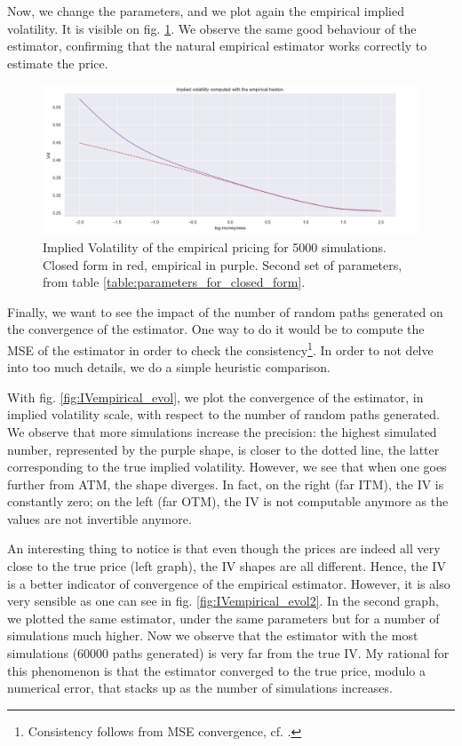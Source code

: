 Now, we change the parameters, and we plot again the empirical implied volatility. It is visible on fig. \ref{fig:IVempirical2}. We observe the same good behaviour of the estimator, confirming that the natural empirical estimator works correctly to estimate the price.

\begin{figure}
\centering
\includegraphics[width = 0.7 \textwidth]{../addition_part/images/integration_fft/IVempirical2.png}
\caption{Implied Volatility of the empirical pricing for 5000 simulations. Closed form in red, empirical in purple. Second set of parameters, from table \ref{table:parameters_for_closed_form}. }
\label{fig:IVempirical2}
\end{figure}

Finally, we want to see the impact of the number of random paths generated on the convergence of the estimator. One way to do it would be to compute the MSE of the estimator in order to check the consistency\footnote{Consistency follows from MSE convergence, cf. \cite{panaretos}.}. In order to not delve into too much details, we do a simple heuristic comparison.

With fig. \ref{fig:IVempirical_evol}, we plot the convergence of the estimator, in implied volatility scale, with respect to the number of random paths generated. We observe that more simulations increase the precision: the highest simulated number, represented by the purple shape, is closer to the dotted line, the latter corresponding to the true implied volatility. However, we see that when one goes further from ATM, the shape diverges. In fact, on the right (far ITM), the IV is constantly zero; on the left (far OTM), the IV is not computable anymore as the values are not invertible anymore.

An interesting thing to notice is that even though the prices are indeed all very close to the true price (left graph), the IV shapes are all different. Hence, the IV is a better indicator of convergence of the empirical estimator. However, it is also very sensible as one can see in fig. \ref{fig:IVempirical_evol2}. In the second graph, we plotted the same estimator, under the same parameters but for a number of simulations much higher. Now we observe that the estimator with the most simulations (60000 paths generated) is very far from the true IV. My rational for this phenomenon is that the estimator converged to the true price, modulo a numerical error, that stacks up as the number of simulations increases.

